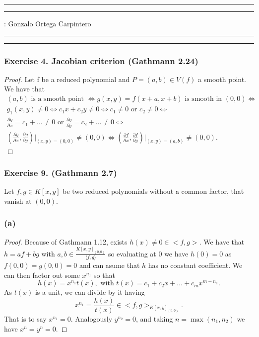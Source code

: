 \documentclass[11pt,a4paper]{article}
\begin{document}
\hrule\hrule
\vspace{1mm}


\vspace{1mm}

 : Gonzalo Ortega Carpintero
\vspace{2mm}

\hrule\hrule

\subsubsection*{\bf Exercise 4. Jacobian criterion (Gathmann 2.24)}
\begin{proof}
  Let f be a reduced polynomial and $ P = (a,b) \in V(f) $ a smooth point. We have that
  \begin{gather*}
    (a, b) \text{ is a smooth point } \Leftrightarrow g(x,y) = f(x+a, x+b) \text{ is smooth in } (0,0) \Leftrightarrow \\
    g_1(x,y) \neq 0 \Leftrightarrow c_1x + c_2y \neq 0 \Leftrightarrow c_1 \neq 0 \text{ or } c_2 \neq 0 \Leftrightarrow \\
    \frac{\partial g}{\partial x} = c_1 + \dots \neq 0 \text{ or } \frac{\partial g}{\partial y} = c_2 + \dots \neq 0 \Leftrightarrow \\
    \left(\frac{\partial g}{\partial x}, \frac{\partial g}{\partial y}\right)\Bigg|_{(x,y)=(0,0)} \neq (0,0) \Leftrightarrow \left(\frac{\partial f}{\partial x}, \frac{\partial f}{\partial y}\right)\Bigg|_{(x,y)=(a,b)} \neq (0,0).
  \end{gather*}
\end{proof}

\subsubsection*{\bf Exercise 9. (Gathmann 2.7)}
Let $ f, g \in K[x,y] $ be two reduced polynomials without a common factor, that vanish at $ (0,0) $.

\subsubsection*{\bf (a)}
\begin{proof} 
  Because of Gathmann 1.12, exists $ h(x) \neq 0 \in <f, g>$. We have that $ h = af + bg $ with $ a,b \in \frac{K[x,y]_{(0,0)}}{\langle f,g \rangle} $ so evaluating at $ 0 $ we have $ h(0) = 0 $ as $ f(0,0) = g (0,0) = 0 $ and can asume that $ h $ has no constant coefficient. We can then factor out some $x^{n_1} $ so that
  $$
    h(x) = x^{n_1} t(x), \text{ with } t(x) = c_1 + c_2x + \dots + c_m x^{m-n_1}.
  $$
  As $ t(x)$ is a unit, we can divide by it having
  $$
    x^{n_1} = \frac{h(x)}{t(x)} \in <f, g>_{K[x, y]_{(0,0)}}.
  $$
  That is to say $ x^{n_1} = 0 $. Analogously $ y^{n_2} = 0 $, and taking $ n= \operatorname{max}(n_1, n_2) $ we have $ x^n = y^n = 0 $.

\end{proof}
\end{document}
